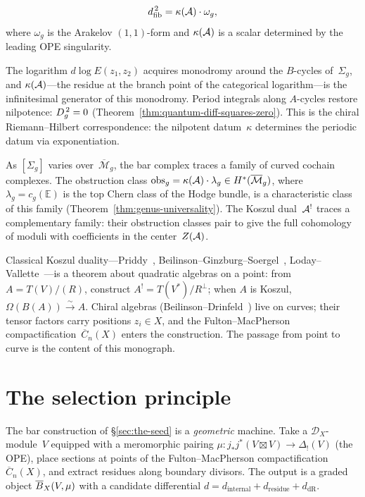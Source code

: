 \begin{equation}\label{eq:curvature-intro}
d_{\mathrm{fib}}^{\,2} = \kappa(\mathcal{A}) \cdot \omega_g,
\end{equation}
where $\omega_g$ is the Arakelov $(1,1)$-form and $\kappa(\mathcal{A})$
is a scalar determined by the leading OPE singularity.

The
logarithm $d\log E(z_1,z_2)$ acquires monodromy around the
$B$-cycles of~$\Sigma_g$, and $\kappa(\mathcal{A})$---the residue at the
branch point of the categorical logarithm---is the infinitesimal
generator of this monodromy.  Period integrals along $A$-cycles
restore nilpotence: $D_{g}^{\,2} = 0$
(Theorem~\ref{thm:quantum-diff-squares-zero}).
This is the chiral Riemann--Hilbert correspondence: the nilpotent
datum~$\kappa$ determines the periodic datum via exponentiation.

As $[\Sigma_g]$ varies over~$\overline{\mathcal{M}}_g$, the bar
complex traces a family of curved cochain complexes.  The
obstruction class $\mathrm{obs}_g = \kappa(\mathcal{A}) \cdot \lambda_g \in
H^*(\overline{\mathcal{M}}_g)$, where $\lambda_g = c_g(\mathbb{E})$
is the top Chern class of the Hodge bundle, is a characteristic
class of this family (Theorem~\ref{thm:genus-universality}).
The Koszul dual~$\mathcal{A}^!$ traces a complementary family: their
obstruction classes pair to give the full cohomology of moduli with
coefficients in the center~$Z(\mathcal{A})$.

Classical Koszul duality---Priddy~\cite{Priddy70},
Beilinson--Ginzburg--Soergel~\cite{BGS96},
Loday--Vallette~\cite{LV12}---is a theorem about quadratic algebras
on a point: from $A = T(V)/(R)$, construct
$A^! = T(V^*)/R^\perp$; when $A$ is Koszul,
$\Omega(B(A)) \xrightarrow{\sim} A$.
Chiral algebras (Beilinson--Drinfeld~\cite{BD04}) live on curves;
their tensor factors carry positions $z_i \in X$, and the
Fulton--MacPherson compactification~$\overline{C}_n(X)$ enters the
construction.  The passage from point to curve is the content of
this monograph.


\section{The selection principle}
\label{sec:selection-principle}

The bar construction of \S\ref{sec:the-seed} is a
\emph{geometric} machine.  Take a $\mathcal{D}_X$-module~$V$
equipped with a meromorphic pairing
$\mu \colon j_* j^*(V \boxtimes V) \to \Delta_!(V)$
(the OPE), place sections at points of the Fulton--MacPherson
compactification~$\overline{C}_n(X)$, and extract residues along
boundary divisors.  The output is a graded object
$\overline{B}_X(V, \mu)$ with a candidate differential
$d = d_{\mathrm{internal}} + d_{\mathrm{residue}}
+ d_{\mathrm{dR}}$.


